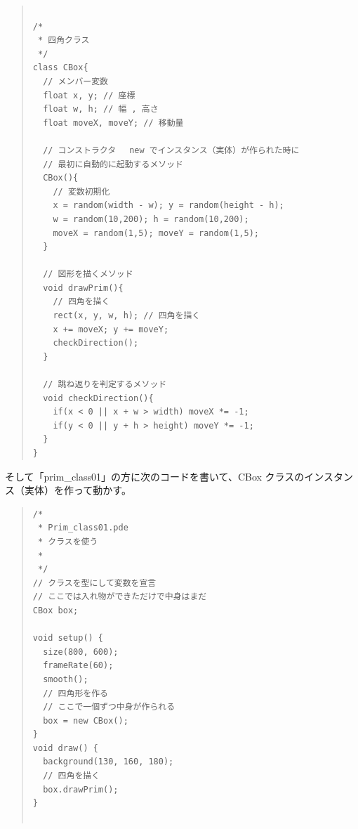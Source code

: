 \documentclass[uplatex,a4j,11pt]{jsarticle}
\renewcommand{\baselinestretch}{1.08}
\begin{document}
    \begin{quote}
	\begin{minipage}{\linewidth}
	 \begin{shadebox}
      \def\baselinestretch{.8}\selectfont
      \small
      \begin{verbatim}

/*
 * 四角クラス
 */
class CBox{
  // メンバー変数
  float x, y; // 座標
  float w, h; // 幅 , 高さ
  float moveX, moveY; // 移動量

  // コンストラクタ　 new でインスタンス（実体）が作られた時に
  // 最初に自動的に起動するメソッド
  CBox(){
    // 変数初期化
    x = random(width - w); y = random(height - h);
    w = random(10,200); h = random(10,200);
    moveX = random(1,5); moveY = random(1,5);
  }

  // 図形を描くメソッド
  void drawPrim(){
    // 四角を描く
    rect(x, y, w, h); // 四角を描く
    x += moveX; y += moveY;
    checkDirection();
  }

  // 跳ね返りを判定するメソッド
  void checkDirection(){
    if(x < 0 || x + w > width) moveX *= -1;
    if(y < 0 || y + h > height) moveY *= -1;
  }
}

      \end{verbatim}
	 \end{shadebox} 
	 \end{minipage}
	\end{quote}


そして「prim\_class01」の方に次のコードを書いて、CBox クラスのインスタン
ス（実体）を作って動かす。


    \begin{quote}
	\begin{minipage}{\linewidth}
	 \begin{shadebox}
      \def\baselinestretch{.8}\selectfont
      \small
      \begin{verbatim}
/*
 * Prim_class01.pde
 * クラスを使う
 * 
 */
// クラスを型にして変数を宣言
// ここでは入れ物ができただけで中身はまだ
CBox box;

void setup() {
  size(800, 600);
  frameRate(60);
  smooth();
  // 四角形を作る
  // ここで一個ずつ中身が作られる
  box = new CBox();
}
void draw() {
  background(130, 160, 180);
  // 四角を描く
  box.drawPrim(); 
}
 
      \end{verbatim}
	 \end{shadebox} 
	 \end{minipage}
	\end{quote}
\end{document}
